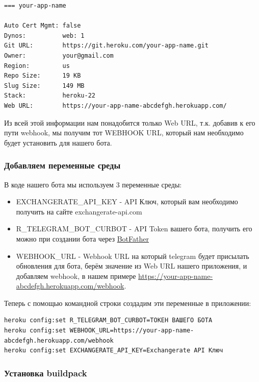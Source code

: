 \documentclass[
]{book}
\providecommand{\tightlist}{%
  \setlength{\itemsep}{0pt}\setlength{\parskip}{0pt}}
\begin{document}
\begin{verbatim}
=== your-app-name

Auto Cert Mgmt: false
Dynos:          web: 1
Git URL:        https://git.heroku.com/your-app-name.git
Owner:          your@gmail.com
Region:         us
Repo Size:      19 KB
Slug Size:      149 MB
Stack:          heroku-22
Web URL:        https://your-app-name-abcdefgh.herokuapp.com/
\end{verbatim}

Из всей этой информации нам понадобится только Web URL, т.к. добавив к его пути webhook, мы получим тот WEBHOOK URL, который нам необходимо будет установить для нашего бота.

\subsubsection{Добавляем переменные среды}\label{ux434ux43eux431ux430ux432ux43bux44fux435ux43c-ux43fux435ux440ux435ux43cux435ux43dux43dux44bux435-ux441ux440ux435ux434ux44b}

В коде нашего бота мы используем 3 переменные среды:

\begin{itemize}
\tightlist
\item
  EXCHANGERATE\_API\_KEY - API Ключ, который вам необходимо получить на сайте exchangerate-api.com
\item
  R\_TELEGRAM\_BOT\_CURBOT - API Token вашего бота, получить его можно при создании бота через \href{https://t.me/BotFather}{BotFather}
\item
  WEBHOOK\_URL - Webhook URL на который telegram будет присылать обновления для бота, берём значение из Web URL нашего приложения, и добавляем webhook, в нашем примере \url{https://your-app-name-abcdefgh.herokuapp.com/webhook}.
\end{itemize}

Теперь с помощью командной строки создадим эти переменные в приложении:

\begin{verbatim}
heroku config:set R_TELEGRAM_BOT_CURBOT=ТОКЕН ВАШЕГО БОТА
heroku config:set WEBHOOK_URL=https://your-app-name-abcdefgh.herokuapp.com/webhook
heroku config:set EXCHANGERATE_API_KEY=Exchangerate API Ключ
\end{verbatim}

\subsubsection{Установка buildpack}\label{ux443ux441ux442ux430ux43dux43eux432ux43aux430-buildpack}
\end{document}
